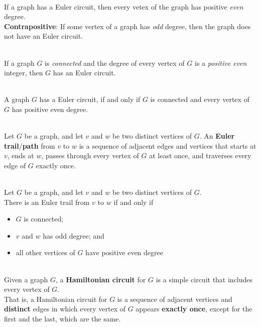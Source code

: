 \documentclass[12pt]{article}
\begin{document}
\begin{theorem}[10.2.2]
\hfill\\
\normalfont If a graph has a Euler circuit, then every vetex of the graph has positive \textit{even} degree.\\
\textbf{Contrapositive}: If some vertex of a graph has \textit{odd} degree, then the graph does not have an Euler circuit.
\end{theorem}
\begin{theorem}[10.2.3]
\hfill\\
\normalfont If a graph $G$ is \textit{connected} and the degree of every vertex of $G$ is a \textit{positive even} integer, then $G$ has an Euler circuit.
\end{theorem}
\begin{theorem}[10.2.4]
\hfill\\
\normalfont A graph $G$ has a Euler circuit, if and only if $G$ is connected and every vertex of $G$ has positive even degree. 
\end{theorem}
\begin{definition}
\hfill\\
\normalfont Let $G$ be a graph, and let $v$ and $w$ be two distinct vertices of $G$. An \textbf{Euler trail}/\textbf{path} from $v$ to $w$ is a sequence of adjacent edges and vertices that starts at $v$, ends at $w$, passes through every vertex of $G$ at least once, and traverses every edge of $G$ exactly once.
\end{definition}
\begin{corollary}[10.2.5]
\hfill\\
\normalfont Let $G$ be a graph, and let $v$ and $w$ be two distinct vertices of $G$.\\
There is an Euler trail from $v$ to $w$ if and only if 
\begin{itemize}
\item $G$ is connected;
\item $v$ and $w$ has odd degree; and
\item all other vertices of $G$ have positive even degree
\end{itemize}
\end{corollary}
\begin{definition}
\hfill\\
\normalfont Given a graph $G$, a \textbf{Hamiltonian circuit} for $G$ is a simple circuit that includes every vertex of $G$.\\
That is, a Hamiltonian circuit for $G$ is a sequence of adjacent vertices and \textbf{distinct} edges in which every vertex of $G$ appears \textbf{exactly once}, except for the first and the last, which are the same.
\end{definition}
\end{document}

